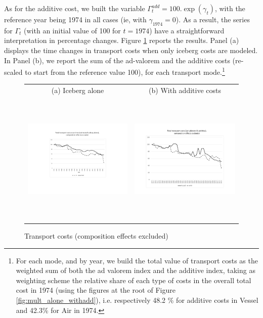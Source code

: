 \documentclass[a4paper,11pt]{article}
\begin{document}
As for the additive cost, we built the variable $\Gamma^{add}_t = 100.\exp(\gamma_t)$, with the reference year being 1974 in all cases (ie, with $\gamma_{1974}=0$). As a result, the series for $\Gamma_t$ (with an initial value of 100 for $t=1974$) have a straightforward interpretation in percentage changes. Figure \ref{fig:totalTC_compeffects_excl} reports the results. Panel (a) displays the time changes in transport costs when only iceberg costs are modeled. In Panel (b), we report the sum of the ad-valorem and the additive costs (re-scaled to start from the reference value 100), for each transport mode.\footnote{For each mode, and by year, we build the total value of transport costs as the weighted sum of both the ad valorem index and the additive index, taking as weighting scheme the relative share of each type of costs in the overall total cost in 1974 (using the figures at the root of Figure \ref{fig:mult_alone_withadd}), i.e. respectively 48.2 \% for additive costs in Vessel and 42.3\% for Air in 1974.}

\begin{figure}[htbp]
\caption{Transport costs (composition effects excluded)}
\label{fig:totalTC_compeffects_excl}
\begin{center}
\begin{tabular}{cc}
{\small (a) Iceberg alone } & {\small (b) With additive costs}\\
\includegraphics[width=3in, height=2.5in]{Fig3a_TC_overtime_comp_effects_excl.pdf}
& \includegraphics[width=3in,height=2.5in]{TC_addplusmult_compeffects_excl.pdf} \\
\end{tabular}
\end{center}
\end{figure}
\end{document}
